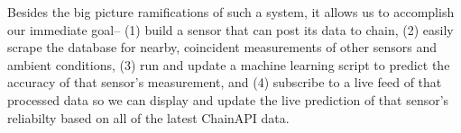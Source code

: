 Besides the big picture ramifications of such a system, it allows us to accomplish our immediate goal-- (1) build a sensor that can post its data to chain, (2) easily scrape the database for nearby, coincident measurements of other sensors and ambient conditions, (3) run and update a machine learning script to predict the accuracy of that sensor's measurement, and (4) subscribe to a live feed of that processed data so we can display and update the live prediction of that sensor's reliabilty based on all of the latest ChainAPI data. 














%
%	
